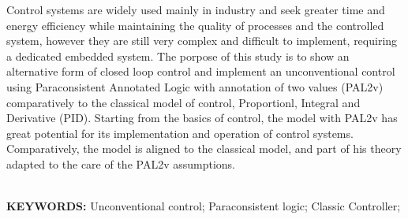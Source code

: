 Control systems are widely used mainly in industry and seek greater time and energy efficiency while maintaining the quality of processes and the controlled system,
however they are still very complex and difficult to implement, requiring a dedicated embedded system.
The porpose of this study is to show an alternative form of closed loop control and implement an unconventional control using Paraconsistent Annotated Logic with annotation of two values (PAL2v)
comparatively to the classical model of control, Proportionl, Integral and Derivative (PID).
Starting from the basics of control, the model with PAL2v has great potential for its implementation and operation of control systems.
Comparatively, the model is aligned to the classical model, and part of his theory adapted to the care of the PAL2v assumptions.
		
\noindent
\textbf{\\KEYWORDS:} Unconventional control; Paraconsistent logic; Classic Controller;

